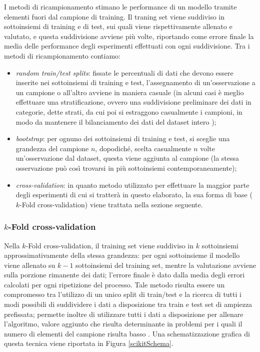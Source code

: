 \documentclass[12pt,a4paper]{report}
\begin{document}
I metodi di ricampionamento stimano le performance di un modello tramite elementi fuori dal campione di training.
Il traning set viene suddiviso in sottoinsiemi di training e di test, sui quali viene rispettivamente allenato e valutato, e questa suddivisione avviene più volte, riportando come errore finale la media delle performance degli esperimenti effettuati con ogni suddivisione.
Tra i metodi di ricampionamento contiamo:

\begin{itemize}
\item{\emph{random train/test splits}}: fissate le percentuali di dati che devono essere inserite nei sottoinsiemi di training e test,  l'assegnamento di un'osservazione a un campione o all'altro avviene in maniera casuale (in alcuni casi è meglio effettuare una stratificazione, ovvero una suddivisione preliminare dei dati in categorie, dette strati, da cui poi si estraggono casualmente i campioni, in modo da mantenere il bilanciamento dei dati del dataset intero \cite{introStat});

\item{\emph{bootstrap}}: per ognuno dei sottoinsiemi di training e test, si sceglie una grandezza del campione $n$, dopodiché,  scelta casualmente $n$ volte un'osservazione dal dataset, questa viene aggiunta al campione (la stessa osservazione può così trovarsi in più sottoinsiemi contemporaneamente); 
\item{\emph{cross-validation}}: in quanto metodo utilizzato per effettuare la maggior parte degli esperimenti di cui si tratterà in questo elaborato, la sua forma di base ($k$-Fold cross-validation) viene trattata nella sezione seguente.
\end{itemize}

\subsubsection{$k$-Fold cross-validation}
\label{kFoldCrossValidationSection}
Nella $k$-Fold cross-validation, il training set viene suddiviso in $k$ sottoinsiemi approssimativamente della stessa grandezza: per ogni sottoinsieme il modello viene allenato su $k - 1$ sottoinsiemi del training set, mentre la valutazione avviene sulla porzione rimanente dei dati; l'errore finale è dato dalla media degli errori calcolati per ogni ripetizione del processo.
Tale metodo risulta essere un compromesso tra l'utilizzo di un unico split di train/test e la ricerca di tutti i modi possibili di suddividere i dati a disposizione tra train e test set di ampiezza prefissata; permette inoltre di utilizzare tutti i dati a disposizione per allenare l'algoritmo, valore aggiunto che risulta determinante in problemi per i quali il numero di elementi del campione risulta basso \cite{scikit-learn}. Una schematizzazione grafica di questa tecnica viene riportata in Figura \ref{scikitSchema}.
\end{document}
